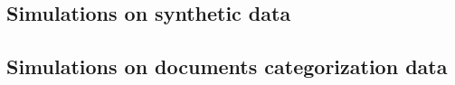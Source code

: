 \subsection{Simulations on synthetic data}

\subsection{Simulations on documents categorization data}
